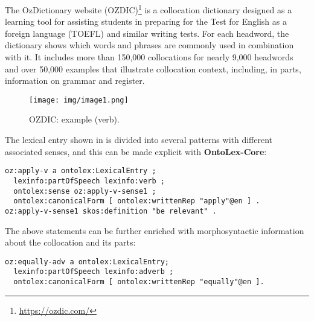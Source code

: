 \documentclass[output=paper,colorlinks,citecolor=brown]{langscibook}
\begin{document}
The OzDictionary website (OZDIC)\footnote{\url{https://ozdic.com/}} is a collocation dictionary designed as a learning tool for assisting students in preparing for the Test for English as a foreign language (TOEFL) and similar writing tests.
For each headword, the dictionary shows which words and phrases are commonly used in combination with
it. It includes more than 150,000 collocations for nearly 9,000 headwords and over 50,000 examples
that illustrate collocation context, including, in parts, information on grammar and register.

\begin{figure}
    \centering
\texttt{[image: img/image1.png]}
    \caption{OZDIC: example  (verb).}
    \label{fig-ozdic1}
\end{figure}

The lexical entry shown in  is divided into several patterns with different associated senses, and this can be made explicit with \textbf{OntoLex-Core}:

{\listingsize
\begin{verbatim}
oz:apply-v a ontolex:LexicalEntry ;
  lexinfo:partOfSpeech lexinfo:verb ;
  ontolex:sense oz:apply-v-sense1 ;
  ontolex:canonicalForm [ ontolex:writtenRep "apply"@en ] .
oz:apply-v-sense1 skos:definition "be relevant" .
\end{verbatim}
}

\noindent
The above statements can be further enriched with morphosyntactic information about the collocation and its parts:

{\listingsize
\begin{verbatim}
oz:equally-adv a ontolex:LexicalEntry;
  lexinfo:partOfSpeech lexinfo:adverb ;
  ontolex:canonicalForm [ ontolex:writtenRep "equally"@en ].
\end{verbatim}
}
\end{document}
